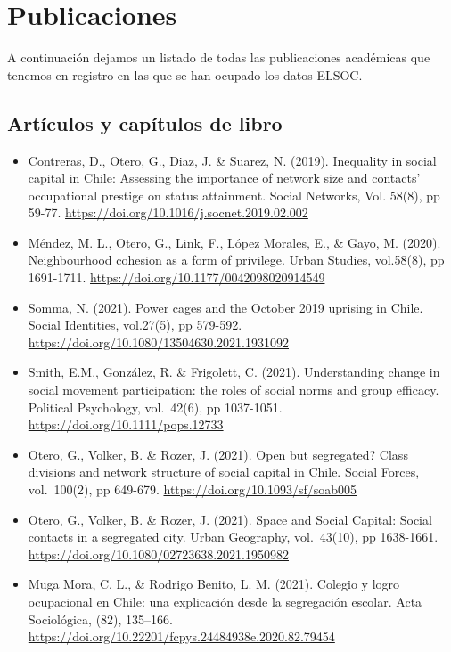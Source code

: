 \documentclass[
  12pt,
]{article}
\providecommand{\tightlist}{%
  \setlength{\itemsep}{0pt}\setlength{\parskip}{0pt}}
\begin{document}
\newpage

\hypertarget{publicaciones}{%
\section{Publicaciones}\label{publicaciones}}

A continuación dejamos un listado de todas las publicaciones académicas que tenemos en registro en las que se han ocupado los datos ELSOC.

\hypertarget{artuxedculos-y-capuxedtulos-de-libro}{%
\subsection{Artículos y capítulos de libro}\label{artuxedculos-y-capuxedtulos-de-libro}}

\begin{itemize}
\tightlist
\item
  Contreras, D., Otero, G., Diaz, J. \& Suarez, N. (2019). Inequality in social capital in Chile: Assessing the importance of network size and contacts' occupational prestige on status attainment. Social Networks, Vol. 58(8), pp 59-77. \url{https://doi.org/10.1016/j.socnet.2019.02.002}
\item
  Méndez, M. L., Otero, G., Link, F., López Morales, E., \& Gayo, M. (2020). Neighbourhood cohesion as a form of privilege. Urban Studies, vol.58(8), pp 1691-1711. \url{https://doi.org/10.1177/0042098020914549}
\item
  Somma, N. (2021). Power cages and the October 2019 uprising in Chile. Social Identities, vol.27(5), pp 579-592. \url{https://doi.org/10.1080/13504630.2021.1931092}
\item
  Smith, E.M., González, R. \& Frigolett, C. (2021). Understanding change in social movement participation: the roles of social norms and group efficacy. Political Psychology, vol.~42(6), pp 1037-1051. \url{https://doi.org/10.1111/pops.12733}
\item
  Otero, G., Volker, B. \& Rozer, J. (2021). Open but segregated? Class divisions and network structure of social capital in Chile. Social Forces, vol.~100(2), pp 649-679. \url{https://doi.org/10.1093/sf/soab005}
\item
  Otero, G., Volker, B. \& Rozer, J. (2021). Space and Social Capital: Social contacts in a segregated city. Urban Geography, vol.~43(10), pp 1638-1661. \url{https://doi.org/10.1080/02723638.2021.1950982}
\item
  Muga Mora, C. L., \& Rodrigo Benito, L. M. (2021). Colegio y logro ocupacional en Chile: una explicación desde la segregación escolar. Acta Sociológica, (82), 135--166. \url{https://doi.org/10.22201/fcpys.24484938e.2020.82.79454}

\end{itemize}
\end{document}
